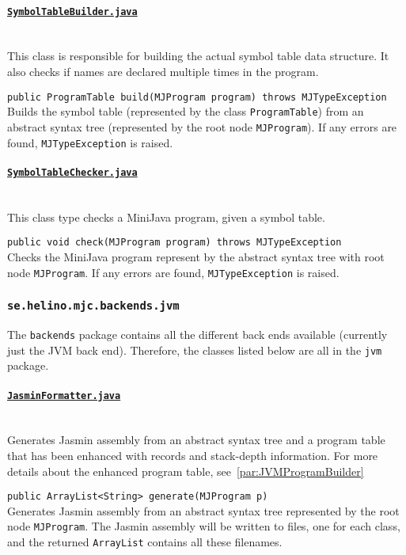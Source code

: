 \documentclass[11pt,oneside,a4paper]{article}
\newcommand{\code}[1]{\texttt{#1}}
\newcommand{\class}[1]{\underline{\texttt{#1}}}
\begin{document}
\paragraph{\class{SymbolTableBuilder.java}} \hfill \\
This class is responsible for building the actual symbol table data structure.
It also checks if names are declared multiple times in the program.
\begin{description}
    \item{\code{public ProgramTable build(MJProgram program) throws
                  MJTypeException}} \hfill \\
        Builds the symbol table (represented by the class
        \code{ProgramTable}) from an abstract syntax tree (represented by the 
        root node \code{MJProgram}). If any errors are found,
        \code{MJTypeException} is raised.
\end{description}

\paragraph{\class{SymbolTableChecker.java}} \hfill \\
This class type checks a MiniJava program, given a symbol table.
\begin{description}
    \item{\code{public void check(MJProgram program) throws MJTypeException}}
    \hfill \\
        Checks the MiniJava program represent by the abstract
        syntax tree with root node \code{MJProgram}. If any errors are found,
        \code{MJTypeException} is raised.
\end{description}

\subsubsection{\texttt{se.helino.mjc.backends.jvm}}
The \code{backends} package contains all the different back ends available
(currently just the JVM back end). Therefore, the classes listed below are all
in the \code{jvm} package.

\paragraph{\class{JasminFormatter.java}} \hfill \\
Generates Jasmin assembly from an abstract syntax tree and a program table that
has been enhanced with records and stack-depth information. For more details
about the enhanced program table, see~\ref{par:JVMProgramBuilder}
\begin{description}
    \item{\code{public ArrayList<String> generate(MJProgram p)}} \hfill \\
        Generates Jasmin assembly from an abstract syntax tree represented by
        the root node \code{MJProgram}. The Jasmin assembly will be written to
        files, one for each class, and the returned \code{ArrayList} contains
        all these filenames.
\end{description}
\end{document}
